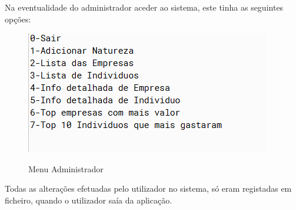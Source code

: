 \documentclass[10pt, a4paper]{report}
\begin{document}
Na eventualidade do administrador aceder ao sistema, este tinha as seguintes opções:

\begin{figure}[h]
\caption{Menu Administrador}
\centering
\includegraphics{Admin}
\label{menu3}
\end{figure}

Todas as alterações efetuadas pelo utilizador no sistema, só eram registadas em ficheiro, quando o utilizador saía da aplicação.
\end{document}
